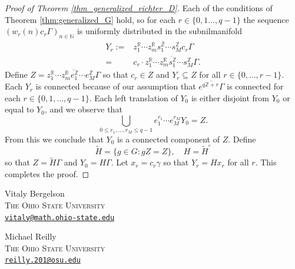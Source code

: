 \documentclass[12pt]{article}
\theoremstyle{plain} %
\theoremstyle{definition} %
\theoremstyle{plain}
\theoremstyle{plain}
\numberwithin{equation}{section}
\newcommand{\N}{\mathbb{N}}
\newcommand{\Z}{\mathbb{Z}}
\newcommand{\R}{\mathbb{R}}
\renewcommand{\leq}{\leqslant}
\renewcommand{\subset}{\subseteq}
\newcommand{\1}{\mathbbm{1}}
\begin{document}
\begin{proof}[Proof of Theorem \ref{thm_generalized_richter_D}]
    Each of the conditions of Theorem \ref{thm:generalized_G} hold, so for each $r\in \{0,1\dots, q-1\}$ the sequence $(w_r(n)c_r\Gamma)_{n\in \N}$ is uniformly distributed in the subnilmanifold
    \begin{align*}
       Y_r:= &\overline{z_1^{\R}\cdots z_m^{\R}s_1^{\Z}\cdots s_{M}^{\Z}c_r\Gamma}\\
       =&c_r\cdot \overline{z_1^{\R}\cdots z_m^{\R}s_1^{\Z}\cdots s_{M}^{\Z}\Gamma}.
    \end{align*}
    Define $Z  =\overline{z_1^{\R}\cdots z_m^{\R}e_1^{\Z}\cdots e_{M}^{\Z}\Gamma}$ so that $c_r\in Z$ and $Y_r\subset Z$ for all $r\in \{0,\dots, r-1\}$. Each $Y_r$ is connected because of our assumption that $\overline{e^{q\Z+r}\Gamma}$ is connected for each $r\in \{0,1,\dots, q-1\}$. Each left translation of $Y_0$ is either disjoint from $Y_0$ or equal to $Y_0$, and we observe that 
    $$
    \bigcup_{0\leq r_1,\dots, r_M\leq q-1}e_1^{r_{1}}\cdots e_{M}^{r_M}Y_0 = Z.
    $$
From this we conclude that $Y_0$ is a connected component of $Z$. 
    Define 
    $$
    \tilde{H} = \{g\in G: gZ=Z\}, \quad H = \tilde{H}^{\circ}
    $$
    so that $Z = \tilde{H}\Gamma$ and $Y_0 = H\Gamma$. Let $x_r = c_r\gamma$ so that $Y_r = Hx_r$ for all $r$. This completes the proof.
\end{proof}











\bigskip
\footnotesize
\noindent
Vitaly Bergelson\\
\textsc{The Ohio State University}\\
\href{mailto:vitaly@math.ohio-state.edu}
{\texttt{vitaly@math.ohio-state.edu}}

\bigskip
\noindent
Michael Reilly\\
\textsc{The Ohio State University}\\
\href{mailto:reilly.201@osu.edu}
{\texttt{reilly.201@osu.edu}}


\end{document}
